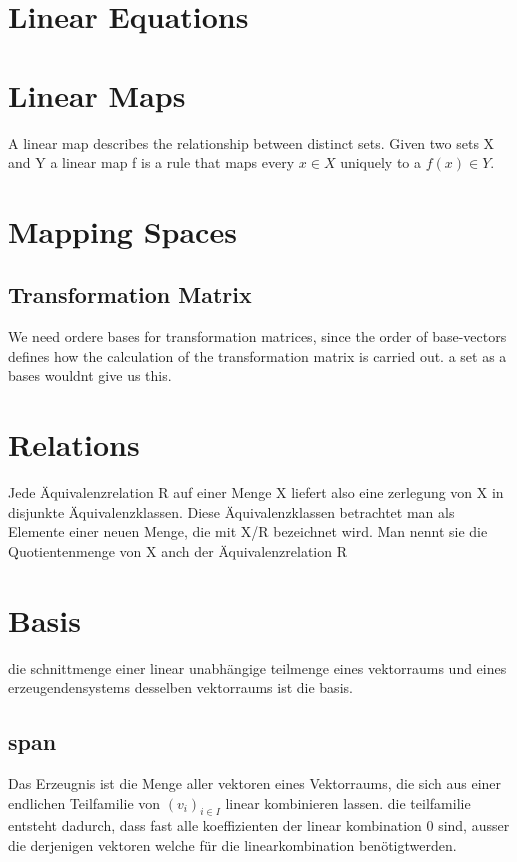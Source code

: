 \section{Linear Equations}
\section{Linear Maps}
A linear map describes the relationship between distinct sets. Given two sets X and Y a linear map f is a rule that maps every \(x \in X\) uniquely to a \(f(x) \in Y\).
\section{Mapping Spaces}

\subsection{Transformation Matrix}
We need ordere bases for transformation matrices, since the order of base-vectors defines how the calculation of the transformation matrix is carried out. a set as a bases wouldnt give us this.

\section{Relations}
Jede Äquivalenzrelation R auf einer Menge X liefert also eine zerlegung von X in disjunkte Äquivalenzklassen.
Diese Äquivalenzklassen betrachtet man als Elemente einer neuen Menge, die mit X/R bezeichnet wird.
Man nennt sie die Quotientenmenge von X anch der Äquivalenzrelation R

\section{Basis}
die schnittmenge einer linear unabhängige teilmenge eines vektorraums und eines erzeugendensystems desselben vektorraums ist die basis.

\subsection{span}
Das Erzeugnis ist die Menge aller vektoren eines Vektorraums, die sich aus einer endlichen Teilfamilie von \((v_i)_{i \in I}\) linear kombinieren lassen.
die teilfamilie entsteht dadurch, dass fast alle koeffizienten der linear kombination 0 sind, ausser die derjenigen vektoren welche für die linearkombination benötigtwerden.
